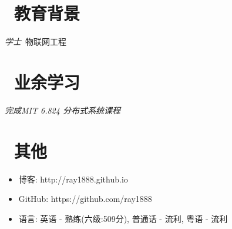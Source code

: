 \documentclass{resume}
\begin{document}
\section{\faGraduationCap\  教育背景}
\textit{学士}\ 物联网工程

\section{\faHeartO\ 业余学习}
\textit{完成MIT 6.824 分布式系统课程}

\section{\faInfo\ 其他}
\begin{itemize}[parsep=0.5ex]
    \item 博客: http://ray1888.github.io 
    \item GitHub: https://github.com/ray1888
    \item 语言: 英语 - 熟练(六级:509分), 普通话 - 流利, 粤语 - 流利
\end{itemize}

%
%
\end{document}
